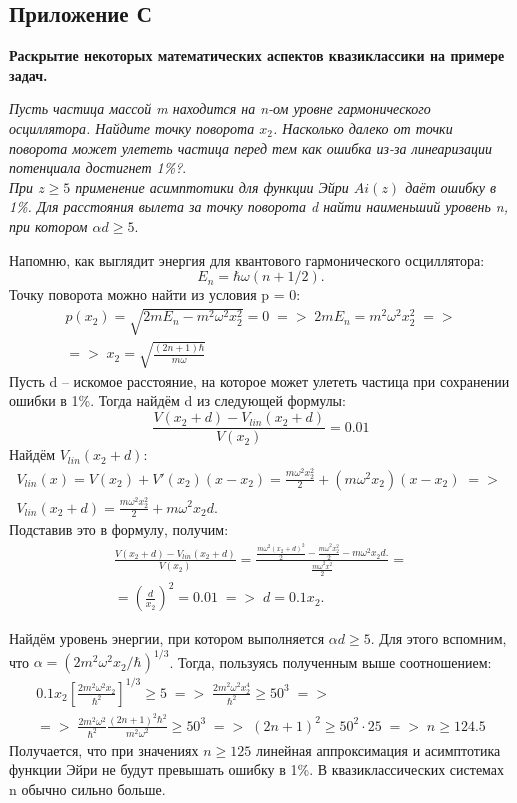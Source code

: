 \setcounter{figure}{0} 
\begin{center}
    \section{Приложение С}\label{appendix:C}
    \textbf{\Large{Раскрытие некоторых математических аспектов квазиклассики на примере задач.}}
\end{center}

\begin{center}
\textit{Пусть частица массой m находится на n-ом уровне гармонического осциллятора. Найдите точку поворота $x_2$. Насколько далеко от точки поворота может улететь частица перед тем как ошибка из-за линеаризации потенциала достигнет 1\%?}.\\
\textit{При $z\geq 5$ применение асимптотики для функции Эйри $Ai(z)$ даёт ошибку в 1\%. Для расстояния вылета за точку поворота d найти наименьший уровень n, при котором $\alpha d\geq 5$}.
\end{center}
Напомню, как выглядит энергия для квантового гармонического осциллятора: 
\[E_n = \hbar\omega(n + 1/2).\] Точку поворота можно найти из условия p = 0:
\begin{gather*} 
p(x_2) = \sqrt{2mE_n - m^2\omega^2x_2^2} = 0\; => \; 2mE_n = m^2\omega^2x_2^2 \; => \\
=>\; x_2 = \sqrt{\frac{(2n + 1)\hbar}{m\omega}}
\end{gather*}
Пусть d -- искомое расстояние, на которое может улететь частица при сохранении ошибки в 1\%. Тогда найдём d из следующей формулы:
\[
\frac{V(x_2 + d) - V_{lin}(x_2 + d)}{V(x_2)} = 0.01
\]
Найдём $V_{lin}(x_2 + d)$:
\begin{gather*}
V_{lin}(x) = V(x_2) + V'(x_2)(x - x_2) = \frac{m\omega^2 x_2^2}{2} + (m\omega^2 x_2)(x-x_2)\; => \;\\
V_{lin}(x_2 + d) = \frac{m\omega^2 x_2^2}{2} + m\omega^2 x_2d.
\end{gather*}
Подставив это в формулу, получим:
\begin{gather*}
    \frac{V(x_2 + d) - V_{lin}(x_2 + d)}{V(x_2)} = \frac{\frac{m\omega^2 (x_2 + d)^2}{2} - \frac{m\omega^2 x_2^2}{2} - m\omega^2 x_2d.}{\frac{m\omega^2 x^2}{2}} = \\
    = \left(\frac{d}{x_2}\right)^2 =  0.01\; => \; d = 0.1x_2.
\end{gather*}

Найдём уровень энергии, при котором выполняется $\alpha d \geq 5$. Для этого вспомним, что $\alpha = (2m^2\omega^2x_2/\hbar)^{1/3}$. Тогда, пользуясь полученным выше соотношением:
\begin{gather*}
    0.1x_2\left[\frac{2m^2\omega^2x_2}{\hbar^2}\right]^{1/3} \geq 5\; => \; \frac{2m^2\omega^2 x_2^4}{\hbar^2} \geq 50^3 \; => \\
    => \; \frac{2m^2\omega^2}{\hbar^2} \frac{(2n + 1)^2\hbar^2}{m^2\omega^2} \geq 50^3 \; => \; (2n+1)^2 \geq 50^2 \cdot 25 \; => \; n \geq 124.5
\end{gather*}
Получается, что при значениях $n\geq 125$ линейная аппроксимация и асимптотика функции Эйри не будут превышать ошибку в 1\%. В квазиклассических системах n обычно сильно больше.

